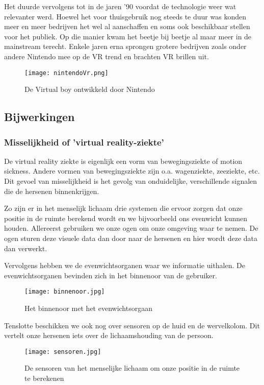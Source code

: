 Het duurde vervolgens tot in de jaren ’90 voordat de technologie weer wat relevanter werd. Hoewel het voor thuisgebruik nog steeds te duur was konden meer en meer bedrijven het wel al aanschaffen en soms ook beschikbaar stellen voor het publiek. Op die manier kwam het beetje bij beetje al maar meer in de mainstream terecht. Enkele jaren erna sprongen grotere bedrijven zoals onder andere Nintendo mee op de VR trend en brachten VR brillen uit. 

\begin{figure}[h]
    \centering
    \texttt{[image: nintendoVr.png]}
    \caption{De Virtual boy ontwikkeld door Nintendo}
\end{figure}

\subsection{Bijwerkingen}
\subsubsection{Misselijkheid of 'virtual reality-ziekte'}

De virtual reality ziekte is eigenlijk een vorm van bewegingsziekte of motion sickness. Andere vormen van bewegingsziekte zijn o.a. wagenziekte, zeeziekte, etc. Dit gevoel van misselijkheid is het gevolg van onduidelijke, verschillende signalen die de hersenen binnenkrijgen.

Zo zijn er in het menselijk lichaam drie systemen die ervoor zorgen dat onze positie in de ruimte berekend wordt en we bijvoorbeeld ons evenwicht kunnen houden.
Allereerst gebruiken we onze ogen om onze omgeving waar te nemen. De ogen sturen deze visuele data dan door naar de hersenen en hier wordt deze data dan verwerkt.

Vervolgens hebben we de evenwichtsorganen waar we informatie uithalen. De evenwichtsorganen bevinden zich in het binnenoor van de gebruiker.

\begin{figure}[h]
    \centering
    \texttt{[image: binnenoor.jpg]}
    \caption{Het binnenoor met het evenwichtsorgaan}
\end{figure}

Tenslotte beschikken we ook nog over sensoren op de huid en de wervelkolom. Dit vertelt onze hersenen iets over de lichaamshouding van de persoon.

\begin{figure}[h]
    \centering
    \texttt{[image: sensoren.jpg]}
    \caption{De sensoren van het menselijke lichaam om onze positie in de ruimte te berekenen}
\end{figure}

